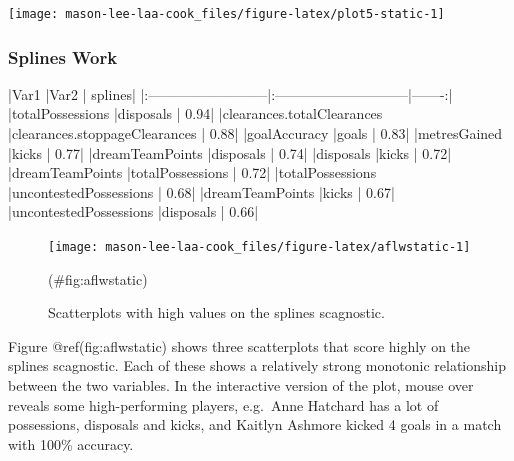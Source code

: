 \begin{Schunk}


\begin{center}\texttt{[image: mason-lee-laa-cook\_files/figure-latex/plot5-static-1]} \end{center}

\end{Schunk}

\hypertarget{splines-work}{%
\subsubsection{Splines Work}\label{splines-work}}

\begin{Schunk}


|Var1                       |Var2                          | splines|
|:--------------------------|:-----------------------------|-------:|
|totalPossessions           |disposals                     |    0.94|
|clearances.totalClearances |clearances.stoppageClearances |    0.88|
|goalAccuracy               |goals                         |    0.83|
|metresGained               |kicks                         |    0.77|
|dreamTeamPoints            |disposals                     |    0.74|
|disposals                  |kicks                         |    0.72|
|dreamTeamPoints            |totalPossessions              |    0.72|
|totalPossessions           |uncontestedPossessions        |    0.68|
|dreamTeamPoints            |kicks                         |    0.67|
|uncontestedPossessions     |disposals                     |    0.66|

\end{Schunk}

\begin{Schunk}
\begin{figure}
\texttt{[image: mason-lee-laa-cook\_files/figure-latex/aflwstatic-1]} \caption[Scatterplots with high values on the splines scagnostic]{Scatterplots with high values on the splines scagnostic.}(\#fig:aflwstatic)
\end{figure}
\end{Schunk}

Figure @ref(fig:aflwstatic) shows three scatterplots that score highly
on the splines scagnostic. Each of these shows a relatively strong
monotonic relationship between the two variables. In the interactive
version of the plot, mouse over reveals some high-performing players,
e.g.~Anne Hatchard has a lot of possessions, disposals and kicks, and
Kaitlyn Ashmore kicked 4 goals in a match with 100\% accuracy.


